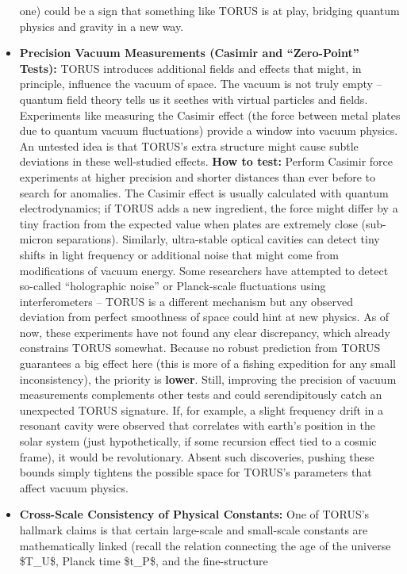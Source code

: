 \begin{itemize}
  one) could be a sign that something like TORUS is at play, bridging
  quantum physics and gravity in a new way.
\item
  \textbf{Precision Vacuum Measurements (Casimir and ``Zero-Point''
  Tests):} TORUS introduces additional fields and effects that might, in
  principle, influence the vacuum of space. The vacuum is not truly
  empty -- quantum field theory tells us it seethes with virtual
  particles and fields. Experiments like measuring the Casimir effect
  (the force between metal plates due to quantum vacuum fluctuations)
  provide a window into vacuum physics. An untested idea is that TORUS's
  extra structure might cause subtle deviations in these well-studied
  effects. \textbf{How to test:} Perform Casimir force experiments at
  higher precision and shorter distances than ever before to search for
  anomalies​. The Casimir effect is usually calculated with quantum
  electrodynamics; if TORUS adds a new ingredient, the force might
  differ by a tiny fraction from the expected value when plates are
  extremely close (sub-micron separations). Similarly, ultra-stable
  optical cavities can detect tiny shifts in light frequency or
  additional noise that might come from modifications of vacuum energy.
  Some researchers have attempted to detect so-called ``holographic
  noise'' or Planck-scale fluctuations using interferometers -- TORUS is
  a different mechanism but any observed deviation from perfect
  smoothness of space could hint at new physics​. As of now, these
  experiments have not found any clear discrepancy, which already
  constrains TORUS somewhat. Because no robust prediction from TORUS
  guarantees a big effect here (this is more of a fishing expedition for
  any small inconsistency), the priority is \textbf{lower}​. Still,
  improving the precision of vacuum measurements complements other tests
  and could serendipitously catch an unexpected TORUS signature. If, for
  example, a slight frequency drift in a resonant cavity were observed
  that correlates with earth's position in the solar system (just
  hypothetically, if some recursion effect tied to a cosmic frame), it
  would be revolutionary. Absent such discoveries, pushing these bounds
  simply tightens the possible space for TORUS's parameters that affect
  vacuum physics.
\item
  \textbf{Cross-Scale Consistency of Physical Constants:} One of TORUS's
  hallmark claims is that certain large-scale and small-scale constants
  are mathematically linked (recall the relation connecting the age of
  the universe \$T\_U\$, Planck time \$t\_P\$, and the fine-structure

\end{itemize}

